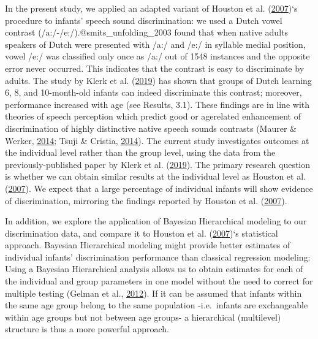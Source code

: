 \documentclass[openright,titlepage,12pt,a4paper]{book}
\begin{document}
In the present study, we applied an adapted variant of Houston et al. (\protect\hyperlink{ref-houston_assessing_2007}{2007})`s procedure to
infants' speech sound discrimination: we used a Dutch vowel contrast (/a:/-/e:/).@smits\_unfolding\_2003 found that when native adults speakers of Dutch were presented with /a:/ and /e:/ in syllable medial position, vowel /e:/ was classified only once as /a:/ out of 1548 instances and the opposite error never occurred. This indicates that the contrast is easy to discriminate by adults. The study by Klerk et al. (\protect\hyperlink{ref-de_klerk_lost_2019}{2019}) has shown that groups of Dutch learning 6, 8, and 10-month-old infants can indeed discriminate this contrast; moreover, performance increased with age (see Results, 3.1). These findings are in line with theories of speech perception which predict good or agerelated enhancement of discrimination of highly distinctive native speech sounds contrasts (Maurer \& Werker, \protect\hyperlink{ref-maurer_perceptual_2014}{2014}; Tsuji \& Cristia, \protect\hyperlink{ref-tsuji_perceptual_2014}{2014}). The current study investigates outcomes at the individual level rather than the group level, using the data from the previously-published paper by Klerk et al. (\protect\hyperlink{ref-de_klerk_lost_2019}{2019}). The primary research question is whether we can obtain similar results at the individual level as Houston et al. (\protect\hyperlink{ref-houston_assessing_2007}{2007}). We expect that a large percentage of individual infants will show evidence of discrimination, mirroring the findings reported by Houston et al. (\protect\hyperlink{ref-houston_assessing_2007}{2007}).

In addition, we explore the application of Bayesian Hierarchical modeling to our discrimination data, and compare it to Houston et al. (\protect\hyperlink{ref-houston_assessing_2007}{2007})`s statistical approach. Bayesian Hierarchical modeling might provide better estimates of individual infants' discrimination performance than classical regression modeling: Using a Bayesian Hierarchical analysis allows us to obtain estimates for each of the individual and group parameters in one model without the need to correct for multiple testing (Gelman et al., \protect\hyperlink{ref-gelman_why_2012}{2012}). If it can be assumed that infants within the same age group belong to the same population -i.e.~infants are exchangeable within age groups but not between age groups- a hierarchical (multilevel) structure is thus a more powerful approach.
\end{document}
